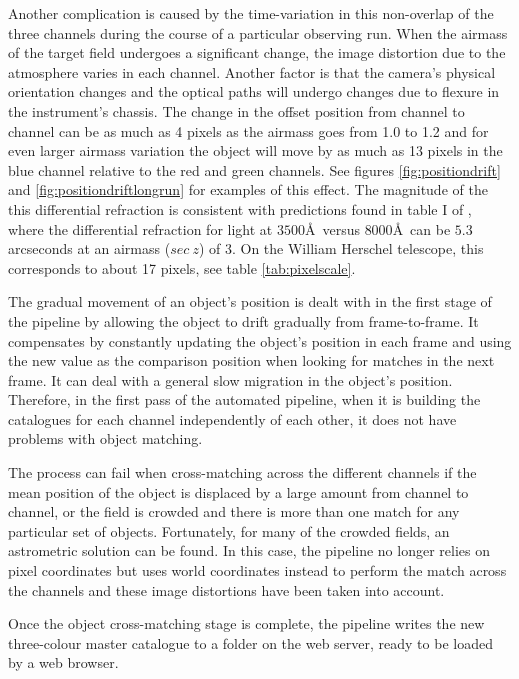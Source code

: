 Another complication is caused by the time-variation in this non-overlap of the three channels during the course of a particular observing run. When the airmass of the target field undergoes a significant change, the image distortion due to the atmosphere varies in each channel. Another factor is that the camera's physical orientation changes and the optical paths will undergo changes due to flexure in the instrument's chassis. The change in the offset position from channel to channel can be as much as 4 pixels as the airmass goes from 1.0 to 1.2 and for even larger airmass variation the object will move by as much as 13 pixels in the blue channel relative to the red and green channels. See figures \ref{fig:positiondrift} and \ref{fig:positiondriftlongrun} for examples of this effect. The magnitude of the this differential refraction is consistent with predictions found in table I of \citet{Filippenko82}, where the differential refraction for light at $3500$\AA\ versus $8000$\AA\ can be $5.3$ arcseconds at an airmass ($sec~z$) of 3. On the William Herschel telescope, this corresponds to about 17 pixels, see table \ref{tab:pixelscale}. 

The gradual movement of an object's position is dealt with in the first stage of the pipeline by allowing the object to drift gradually from frame-to-frame. It compensates by constantly updating the object's position in each frame and using the new value as the comparison position when looking for matches in the next frame. It can deal with a general slow migration in the object's position. Therefore, in the first pass of the automated pipeline, when it is building the catalogues for each channel independently of each other, it does not have problems with object matching. 

The process can fail when cross-matching across the different channels if the mean position of the object is displaced by a large amount from channel to channel, or the field is crowded and there is more than one match for any particular set of objects. Fortunately, for many of the crowded fields, an astrometric solution can be found. In this case, the pipeline  no longer relies on pixel coordinates but uses world coordinates instead to perform the match across the channels and these image distortions have been taken into account. 

Once the object cross-matching stage is complete, the pipeline writes the new three-colour master catalogue to a folder on the web server, ready to be loaded by a web browser. 

